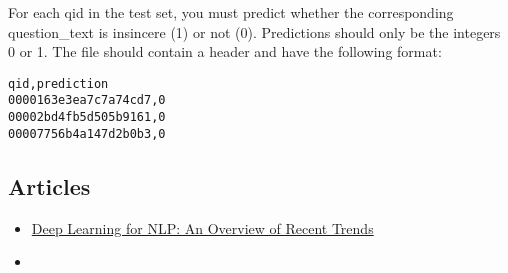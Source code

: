 \documentclass[11pt]{article}
\begin{document}
For each qid in the test set, you must predict whether the corresponding question\_text is insincere (1) or not (0). Predictions should only be the integers 0 or 1. The file should contain a header and have the following format:

\begin{verbatim}
qid,prediction
0000163e3ea7c7a74cd7,0
00002bd4fb5d505b9161,0
00007756b4a147d2b0b3,0
\end{verbatim}


\subsection{Articles}
\label{sec:org137054f}

\begin{itemize}
\item \href{https://medium.com/dair-ai/deep-learning-for-nlp-an-overview-of-recent-trends-d0d8f40a776d}{Deep Learning for NLP: An Overview of Recent Trends}
\item 
\end{itemize}
\end{document}
